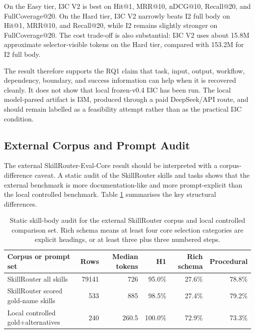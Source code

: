 On the Easy tier, I3C V2 is best on Hit@1, MRR@10, nDCG@10, Recall@20, and FullCoverage@20. On the Hard tier, I3C V2 narrowly beats I2 full body on Hit@1, MRR@10, and Recall@20, while I2 remains slightly stronger on FullCoverage@20. The cost trade-off is also substantial: I3C V2 uses about 15.8M approximate selector-visible tokens on the Hard tier, compared with 153.2M for I2 full body.

The result therefore supports the RQ1 claim that task, input, output, workflow, dependency, boundary, and success information can help when it is recovered cleanly. It does not show that local frozen-v0.4 I3C has been run. The local model-parsed artifact is I3M, produced through a paid DeepSeek/API route, and should remain labelled as a feasibility attempt rather than as the practical I3C condition.

\subsection{External Corpus and Prompt Audit}

The external SkillRouter-Eval-Core result should be interpreted with a corpus-difference caveat. A static audit of the SkillRouter skills and tasks shows that the external benchmark is more documentation-like and more prompt-explicit than the local controlled benchmark. Table \ref{tab:skillrouter-corpus-audit} summarises the key structural differences.

\begin{table}[h]
\centering
\scriptsize
\setlength{\tabcolsep}{3pt}
\begin{tabular}{p{}rrrrr}
\toprule
Corpus or prompt set & Rows & Median tokens & H1 & Rich schema & Procedural \\
\midrule
SkillRouter all skills & 79141 & 726 & 95.0\% & 27.6\% & 78.8\% \\
SkillRouter scored gold-name skills & 533 & 885 & 98.5\% & 27.4\% & 79.2\% \\
Local controlled gold+alternatives & 240 & 260.5 & 100.0\% & 72.9\% & 73.3\% \\
\bottomrule
\end{tabular}
\caption{Static skill-body audit for the external SkillRouter corpus and local controlled comparison set. Rich schema means at least four core selection categories are explicit headings, or at least three plus three numbered steps.}
\label{tab:skillrouter-corpus-audit}
\end{table}

